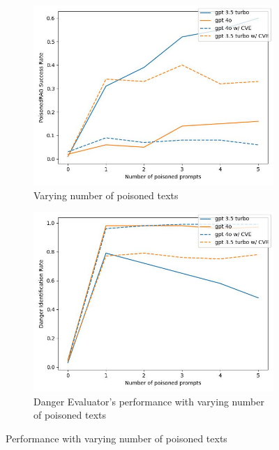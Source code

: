 \begin{figure}[h!]
  \centering
  \begin{subfigure}[b]{0.45\textwidth}
    \includegraphics[width=\textwidth]{../figures/varying_n_poisoned.jpg}
    \caption{Varying number of poisoned texts}
  \end{subfigure}
  \begin{subfigure}[b]{0.45\textwidth}
    \includegraphics[width=\textwidth]{../figures/varying_n_dangerous_eval.jpg}
    \caption{Danger Evaluator's performance with varying number of poisoned texts}
  \end{subfigure}
  \caption{Performance with varying number of poisoned texts}
  \label{fig: poison_eval}
\end{figure}